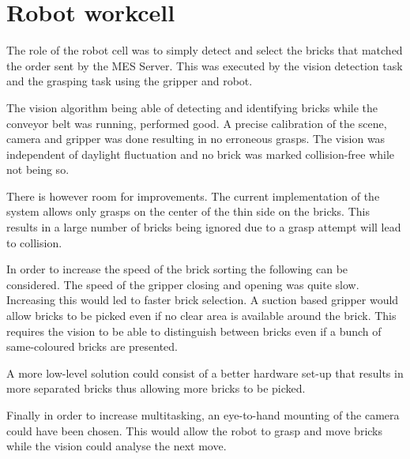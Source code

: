 	\section{Robot workcell} %
	\label{sub:robot_workcell}
	
	The role of the robot cell was to simply detect and select the bricks that matched the order sent by the MES Server. This was executed by the vision detection task and the grasping task using the gripper and robot. 

The vision algorithm being able of detecting and identifying bricks while the conveyor belt was running, performed good. A precise calibration of the scene, camera and gripper was done resulting in no erroneous grasps. The vision was independent of daylight fluctuation and no brick was marked collision-free while not being so.

There is however room for improvements. The current implementation of the system allows only grasps on the center of the thin side on the bricks. This results in a large number of bricks being ignored due to a grasp attempt will lead to collision. 

In order to increase the speed of the brick sorting the following can be considered. 
The speed of the gripper closing and opening was quite slow. Increasing this would led to faster brick selection. 
A suction based gripper would allow bricks to be picked even if no clear area is available around the brick. This requires the vision to be able to distinguish between bricks even if a bunch of same-coloured bricks are presented. 

A more low-level solution could consist of a better hardware set-up that results in more separated bricks thus allowing more bricks to be picked. 

Finally in order to increase multitasking, an eye-to-hand mounting of the camera could have been chosen. This would allow the robot to grasp and move bricks while the vision could analyse the next move. 

